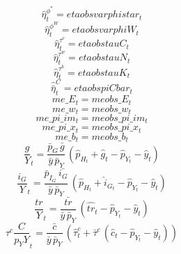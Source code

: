 \begin{dmath}
{\hat{\eta}^{\phi^*}_{t}}={etaobsvarphistar_{t}}
\end{dmath}
\begin{dmath}
{\hat{\eta}^{\phi^W}_{t}}={etaobsvarphiW_{t}}
\end{dmath}
\begin{dmath}
{\hat{\eta}^{\tau^c}_{t}}={etaobstauC_{t}}
\end{dmath}
\begin{dmath}
{\hat{\eta}^{\tau^w}_{t}}={etaobstauN_{t}}
\end{dmath}
\begin{dmath}
{\hat{\eta}^{\tau^k}_{t}}={etaobstauK_{t}}
\end{dmath}
\begin{dmath}
{\hat{\bar{\eta}}^C_{t}}={etaobspiCbar_{t}}
\end{dmath}
\begin{dmath}
{me\_E_{t}}={meobs\_E_{t}}
\end{dmath}
\begin{dmath}
{me\_w_{t}}={meobs\_w_{t}}
\end{dmath}
\begin{dmath}
{me\_pi\_im_{t}}={meobs\_pi\_im_{t}}
\end{dmath}
\begin{dmath}
{me\_pi\_x_{t}}={meobs\_pi\_x_{t}}
\end{dmath}
\begin{dmath}
{me\_b_{t}}={meobs\_b_{t}}
\end{dmath}
\begin{dmath}
{\frac{g}{Y}_{t}}=\frac{{\bar{p}_G}\, {\bar{g}}}{{\bar{y}}\, {\bar{p}_Y}}\, \left({\hat{p}_H_{t}}+{\hat{g}_{t}}-{\hat{p}_Y_{t}}-{\hat{y}_{t}}\right)
\end{dmath}
\begin{dmath}
{\frac{{i}_G}{Y}_{t}}=\frac{{\bar{p}_{I_G}}\, {\bar{i_G}}}{{\bar{y}}\, {\bar{p}_Y}}\, \left({\hat{p}_H_{t}}+{\hat{i}_G_{t}}-{\hat{p}_Y_{t}}-{\hat{y}_{t}}\right)
\end{dmath}
\begin{dmath}
{\frac{tr}{Y}_{t}}=\frac{{\bar{tr}}}{{\bar{y}}\, {\bar{p}_Y}}\, \left({\hat{tr}_{t}}-{\hat{p}_Y_{t}}-{\hat{y}_{t}}\right)
\end{dmath}
\begin{dmath}
{{{\tau}^{c}}\frac{C}{{p_{Y}}Y}_{t}}=\frac{{\bar{c}}}{{\bar{y}}\, {\bar{p}_Y}}\, \left({\hat{\tau}^c_{t}}+{\bar{\tau}^c}\, \left({\hat{c}_{t}}-{\hat{p}_Y_{t}}-{\hat{y}_{t}}\right)\right)
\end{dmath}
